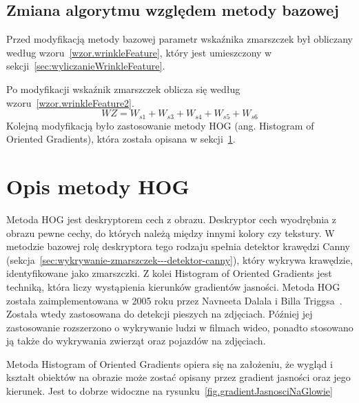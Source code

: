 \documentclass[a4paper,twoside,12pt]{book}
\begin{document}
    \subsection*{Zmiana algorytmu względem metody bazowej}\label{subsec:zmiana-algorytmu-względem-metody-bazowej}
    Przed modyfikacją metody bazowej parametr wskaźnika zmarszczek był obliczany według wzoru~\ref{wzor.wrinkleFeature},
    który jest umieszczony w sekcji~\ref{sec:wyliczanieWrinkleFeature}.

    Po modyfikacji wskaźnik zmarszczek oblicza się według wzoru~\ref{wzor.wrinkleFeature2}.
    \large
    \begin{equation}
        WZ = W_{s1} + W_{s3} + W_{s4} + W_{s5} + W_{s6}
        \label{wzor.wrinkleFeature2}
    \end{equation}
    \normalsize
    Kolejną modyfikacją było zastosowanie metody HOG (ang. Histogram of Oriented Gradients), która została opisana w
    sekcji~\ref{sec:zastosowanie-metody-hog}.

    \section{Opis metody HOG}\label{sec:zastosowanie-metody-hog}
    Metoda HOG jest deskryptorem cech z obrazu.
    Deskryptor cech wyodrębnia z obrazu pewne cechy, do których należą między innymi kolory czy tekstury.
    W metodzie bazowej rolę deskryptora tego rodzaju spełnia detektor
    krawędzi Canny (sekcja~\ref{sec:wykrywanie-zmarszczek---detektor-canny}), który wykrywa krawędzie,
    identyfikowane jako zmarszczki.
    Z kolei Histogram of Oriented Gradients jest techniką, która liczy wystąpienia kierunków gradientów jasności.
    Metoda HOG została zaimplementowana w 2005 roku przez Navneeta Dalala i Billa
    Triggsa~\cite{hogZabojady}.
    Została wtedy zastosowana do detekcji pieszych na zdjęciach.
    Później jej zastosowanie rozszerzono o wykrywanie ludzi w filmach wideo,
    ponadto stosowano ją także do wykrywania zwierząt oraz pojazdów na zdjęciach.

    Metoda Histogram of Oriented Gradients opiera się na założeniu, że wygląd i kształt obiektów na obrazie może zostać
    opisany przez gradient jasności oraz jego kierunek. Jest to dobrze widoczne na
    rysunku~\ref{fig.gradientJasnosciNaGlowie}
\end{document}
